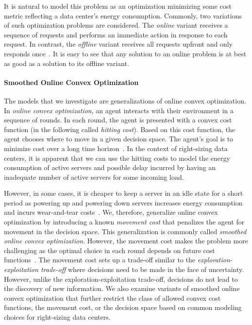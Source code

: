 It is natural to model this problem as an optimization minimizing some cost metric reflecting a data center's energy consumption. Commonly, two variations of such optimization problems are considered. The \emph{online} variant receives a sequence of requests and performs an immediate action in response to each request. In contrast, the \emph{offline} variant receives all requests upfront and only responds once~\cite{Karp1992}. It is easy to see that any solution to an online problem is at best as good as a solution to its offline variant.

\paragraph{Smoothed Online Convex Optimization} The models that we investigate are generalizations of online convex optimization. In \emph{online convex optimization}, an agent interacts with their environment in a sequence of rounds. In each round, the agent is presented with a convex cost function (in the following called \emph{hitting cost}). Based on this cost function, the agent chooses where to move in a given decision space. The agent's goal is to minimize cost over a long time horizon~\cite{Hazan2019}. In the context of right-sizing data centers, it is apparent that we can use the hitting costs to model the energy consumption of active servers and possible delay incurred by having an inadequate number of active servers for some incoming load.

However, in some cases, it is cheaper to keep a server in an idle state for a short period as powering up and powering down servers increases energy consumption and incurs wear-and-tear costs~\cite{Lin2011}. We, therefore, generalize online convex optimization by introducing a known \emph{movement cost} that penalizes the agent for movement in the decision space. This generalization is commonly called \emph{smoothed online convex optimization}. However, the movement cost makes the problem more challenging as the optimal choice in each round depends on future cost functions~\cite{Chen2015}. The movement cost sets up a trade-off similar to the \emph{exploration-exploitation trade-off} where decisions need to be made in the face of uncertainty. However, unlike the exploration-exploitation trade-off, decisions do not lead to the discovery of new information. We also examine variants of smoothed online convex optimization that further restrict the class of allowed convex cost functions, the movement cost, or the decision space based on common modeling choices for right-sizing data centers.

